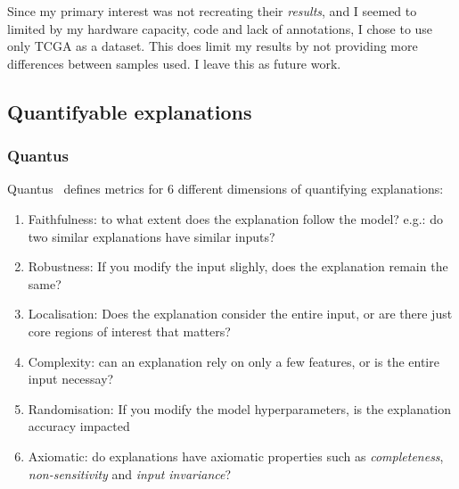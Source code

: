 \documentclass[10pt,twocolumn,letterpaper]{article}
\begin{document}
Since my primary interest was not recreating their \textit{results}, and I seemed to limited by my hardware capacity, code and lack of annotations, I chose to use only \gls{TCGA} as a dataset. This does limit my results by not providing more differences between samples used. I leave this as future work.

% 

\subsection{Quantifyable explanations}\label{sec:quantifiable}
\subsubsection{Quantus}

Quantus~\cite{hedstrom2023quantus} defines metrics for 6 different dimensions of quantifying explanations:
\begin{enumerate}
  \item Faithfulness: to what extent does the explanation follow the model? e.g.: do two similar explanations have similar inputs?
  \item Robustness: If you modify the input slighly, does the explanation remain the same?
  \item Localisation: Does the explanation consider the entire input, or are there just core regions of interest that matters?
  \item Complexity: can an explanation rely on only a few features, or is the entire input necessay?
  \item Randomisation: If you modify the model hyperparameters, is the explanation accuracy impacted
  \item Axiomatic: do explanations have axiomatic properties such as \textit{completeness}, \textit{non-sensitivity} and \textit{input invariance}?
\end{enumerate}
\end{document}
